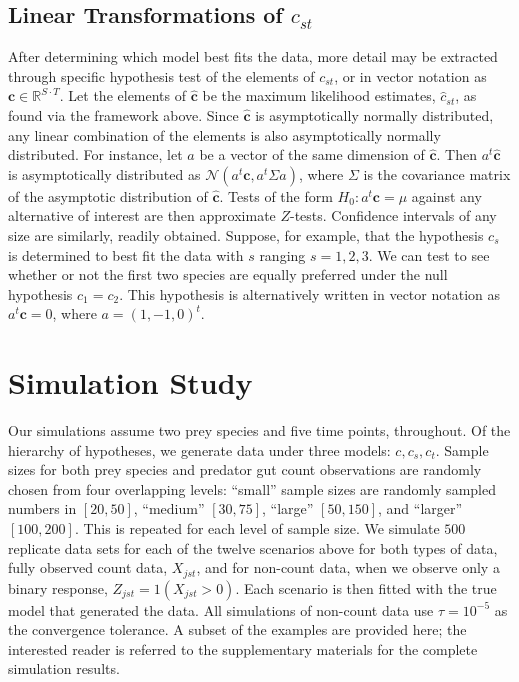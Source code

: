 \documentclass[smallextended]{svjour3}
\begin{document}
\subsection{Linear Transformations of $c_{st}$}

After determining which model best fits the data, more detail may be extracted through specific hypothesis test of the elements of $c_{st}$, or in vector notation as $\mathbf{c} \in \mathbb{R}^{S\cdot T}$.  Let the elements of $\hat{\mathbf{c}}$ be the maximum likelihood estimates, $\hat{c}_{st}$, as found via the framework above.  Since $\hat{\mathbf{c}}$ is asymptotically normally distributed, any linear combination of the elements is also asymptotically normally distributed.  For instance, let $a$ be a vector of the same dimension of $\hat{\mathbf{c}}$.  Then $a^t\hat{\mathbf{c}}$ is asymptotically distributed as $\mathcal{N}(a^t\mathbf{c}, a^t\Sigma a)$, where $\Sigma$ is the covariance matrix of the asymptotic distribution of $\hat{\mathbf{c}}$.  Tests of the form $H_0: a^t\mathbf{c} = \mu$ against any alternative of interest are then approximate $Z$-tests.  Confidence intervals of any size are similarly, readily obtained.  Suppose, for example, that the hypothesis $c_s$ is determined to best fit the data with $s$ ranging $s = 1, 2, 3$.  We can test to see whether or not the first two species are equally preferred under the null hypothesis $c_{1} = c_{2}$.  This hypothesis is alternatively written in vector notation as $a^t\mathbf{c} = 0$, where $a = (1, -1, 0)^t$.  

\section{Simulation Study}
\label{sec:sim}

Our simulations assume two prey species and five time points, throughout.  Of the hierarchy of hypotheses, we generate data under three models: $c, c_s, c_t$.  Sample sizes for both prey species and predator gut count observations are randomly chosen from four overlapping levels: ``small'' sample sizes are randomly sampled numbers in $[20,50]$, ``medium'' $[30,75]$, ``large'' $[50,150]$, and ``larger'' $[100,200]$.  This is repeated for each level of sample size.  We simulate $500$ replicate data sets for each of the twelve scenarios above for both types of data, fully observed count data, $X_{jst}$, and for non-count data, when we observe only a binary response, $Z_{jst} = 1(X_{jst}>0)$.  Each scenario is then fitted with the true model that generated the data.  All simulations of non-count data use $\tau = 10^{-5}$ as the convergence tolerance.  A subset of the examples are provided here; the interested reader is referred to the supplementary materials for the complete simulation results.
\end{document}
